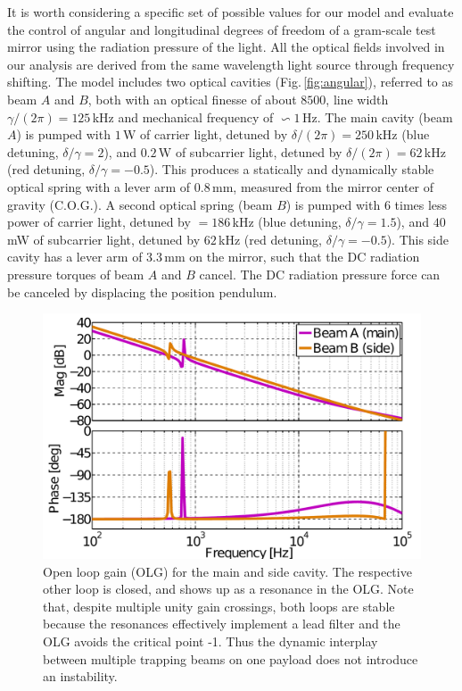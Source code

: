 It is worth considering a specific set of possible values for our model and evaluate the control of  angular and longitudinal degrees of freedom of a gram-scale test mirror using the radiation pressure of the light.
All the optical fields involved in our analysis are derived from the same wavelength light source through frequency shifting.
The model includes two optical cavities (Fig.\,\ref{fig:angular}), referred to as beam $A$ and $B$, both with an optical finesse of  about $8500$, line width $\gamma/(2 \pi) = 125\,$kHz and mechanical frequency of $\backsim 1\,$Hz. 
The main cavity (beam $A$) is pumped with $1\,$W of carrier light, detuned by $\delta/(2 \pi)= 250\,$kHz (blue detuning, $\delta/\gamma = 2$), and $0.2\,$W of subcarrier light, detuned by $\delta/(2 \pi) =62\,$kHz (red detuning, $\delta/\gamma = -0.5$). This produces a statically and dynamically stable optical spring with a lever arm of $0.8\,$mm, measured from the mirror center of gravity (C.O.G.). A second optical spring (beam $B$) is pumped with 6 times less power of carrier light, detuned by $=186\,$kHz (blue detuning, $\delta/\gamma=1.5$), and $40\,$mW of subcarrier light, detuned by $62\,$kHz (red detuning, $\delta/\gamma=-0.5$). This side cavity has a lever arm of $3.3\,$mm on the mirror, such that the DC radiation pressure torques of beam $A$ and $B$ cancel. The DC radiation pressure force can be canceled by displacing the position pendulum.

\begin{figure}[htbp]
	\centering
		\includegraphics[width=.7\textwidth]{figures/theory/open_loops_TF_paper2.pdf}%
	\caption[Open loop gain for the main and side cavity]{Open loop gain (OLG) for the main and side cavity.	The respective other loop is closed, and shows up as a resonance in the OLG. Note that, despite multiple unity gain crossings, both loops are stable because the resonances effectively implement a lead filter and the OLG avoids the critical point -1. Thus the dynamic interplay between multiple trapping beams on one payload does not introduce an instability.}
	\label{fig:control_loops}
\end{figure}


